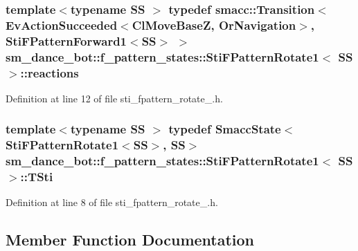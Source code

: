 \subsubsection[{\texorpdfstring{reactions}{reactions}}]{\setlength{\rightskip}{0pt plus 5cm}template$<$typename SS $>$ typedef {\bf smacc\+::\+Transition}$<$Ev\+Action\+Succeeded$<${\bf Cl\+Move\+BaseZ}, {\bf Or\+Navigation}$>$, {\bf Sti\+F\+Pattern\+Forward1}$<$SS$>$ $>$ {\bf sm\+\_\+dance\+\_\+bot\+::f\+\_\+pattern\+\_\+states\+::\+Sti\+F\+Pattern\+Rotate1}$<$ SS $>$\+::{\bf reactions}}\hypertarget{structsm__dance__bot_1_1f__pattern__states_1_1StiFPatternRotate1_a0152d2d4527589122e6f263a4d8903f3}{}\label{structsm__dance__bot_1_1f__pattern__states_1_1StiFPatternRotate1_a0152d2d4527589122e6f263a4d8903f3}


Definition at line 12 of file sti\+\_\+fpattern\+\_\+rotate\+\_.\+h.

\subsubsection[{\texorpdfstring{T\+Sti}{TSti}}]{\setlength{\rightskip}{0pt plus 5cm}template$<$typename SS $>$ typedef {\bf Smacc\+State}$<${\bf Sti\+F\+Pattern\+Rotate1}$<$SS$>$, SS$>$ {\bf sm\+\_\+dance\+\_\+bot\+::f\+\_\+pattern\+\_\+states\+::\+Sti\+F\+Pattern\+Rotate1}$<$ SS $>$\+::{\bf T\+Sti}}\hypertarget{structsm__dance__bot_1_1f__pattern__states_1_1StiFPatternRotate1_a3fafd58718e0f6aada113795bdf2c841}{}\label{structsm__dance__bot_1_1f__pattern__states_1_1StiFPatternRotate1_a3fafd58718e0f6aada113795bdf2c841}


Definition at line 8 of file sti\+\_\+fpattern\+\_\+rotate\+\_.\+h.



\subsection{Member Function Documentation}
